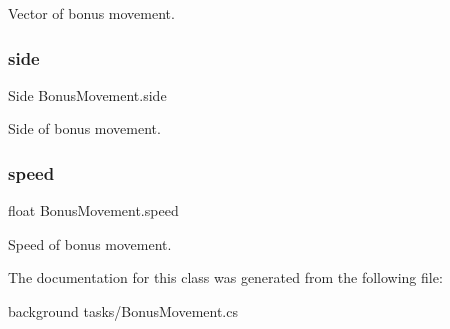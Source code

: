 Vector of bonus movement. 

\mbox{\label{class_bonus_movement_a6e42122052649933fe8e7bb8d50314c7}} 
\subsubsection{\texorpdfstring{side}{side}}
{\footnotesize\ttfamily Side Bonus\+Movement.\+side\hspace{0.3cm}{\ttfamily [private]}}



Side of bonus movement. 

\mbox{\label{class_bonus_movement_af663a81c63835c143bc17cb1f86e8e46}} 
\subsubsection{\texorpdfstring{speed}{speed}}
{\footnotesize\ttfamily float Bonus\+Movement.\+speed}



Speed of bonus movement. 



The documentation for this class was generated from the following file\+:\begin{DoxyCompactItemize}
\item 
background tasks/Bonus\+Movement.\+cs\end{DoxyCompactItemize}
